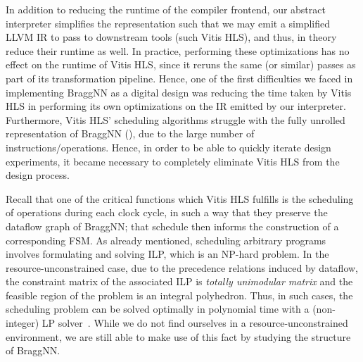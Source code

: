 {In addition to reducing the runtime of the compiler frontend, our abstract interpreter simplifies the representation such that we may emit a simplified LLVM IR to pass to downstream tools (such Vitis HLS), and thus, in theory reduce their runtime as well.
In practice, performing these optimizations has no effect on the runtime of Vitis HLS, since it reruns the same (or similar) passes as part of its transformation pipeline.
Hence, one of the first difficulties we faced in implementing BraggNN as a digital design was reducing the time taken by Vitis HLS in performing its own optimizations on the IR emitted by our interpreter. 
Furthermore, Vitis HLS' scheduling algorithms struggle with the fully unrolled representation of BraggNN (), due to the large number of instructions/operations.
Hence, in order to be able to quickly iterate design experiments, it became necessary to completely eliminate Vitis HLS from the design process.

Recall that one of the critical functions which Vitis HLS fulfills is the scheduling of operations during each clock cycle, in such a way that they preserve the dataflow graph of BraggNN; that schedule then informs the construction of a corresponding FSM.
As already mentioned, scheduling arbitrary programs involves formulating and solving ILP, which is an NP-hard problem.
In the resource-unconstrained case, due to the precedence relations induced by dataflow, the constraint matrix of the associated ILP is \emph{totally unimodular matrix} and the feasible region of the problem is an integral polyhedron. 
Thus, in such cases, the scheduling problem can be solved optimally in polynomial time with a (non-integer) LP solver~\cite{tuprints9272}.
While we do not find ourselves in a resource-unconstrained environment, we are still able to make use of this fact by studying the structure of BraggNN.

}
